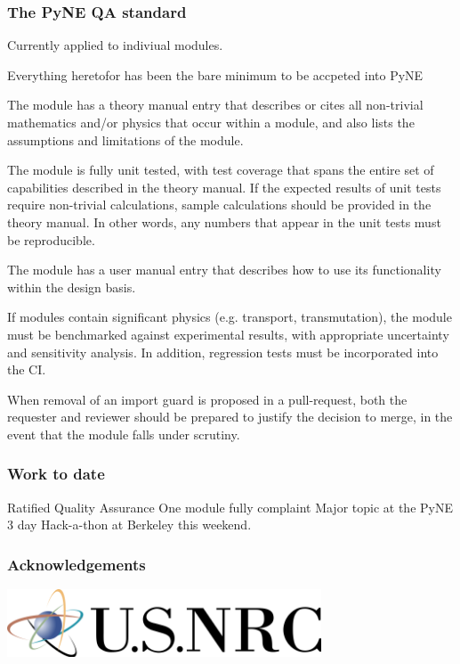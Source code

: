 \documentclass[12pt]{beamer}
\begin{document}
\begin{frame}
\frametitle{The PyNE QA standard}

Currently applied to indiviual modules.

Everything heretofor has been the bare minimum to be accpeted into PyNE

The module has a theory manual entry that describes or cites all non-trivial mathematics and/or physics that occur within a module, and also lists the assumptions and limitations of the module.

The module is fully unit tested, with test coverage that spans the entire set of capabilities described in the theory manual. If the expected results of unit tests require non-trivial calculations, sample calculations should be provided in the theory manual. In other words, any numbers that appear in the unit tests must be reproducible.

The module has a user manual entry that describes how to use its functionality within the design basis.

If modules contain significant physics (e.g. transport, transmutation), the module must be benchmarked against experimental results, with appropriate uncertainty and sensitivity analysis. In addition, regression tests must be incorporated into the CI.

When removal of an import guard is proposed in a pull-request, both the requester and reviewer should be prepared to justify the decision to merge, in the event that the module falls under scrutiny.

\end{frame}


\begin{frame}
\frametitle{Work to date}

Ratified Quality Assurance
One module fully complaint
Major topic at the PyNE 3 day Hack-a-thon at Berkeley this weekend.

\end{frame}


\begin{frame}[fragile]
\frametitle{Acknowledgements}

\includegraphics[height=2cm]{figures/NRClogo.png} \\

\end{frame}
\end{document}
